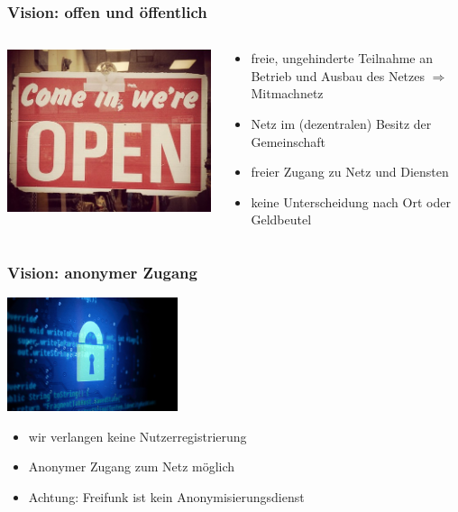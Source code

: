 \documentclass[10pt]{beamer}
\begin{document}
\begin{frame}
	\frametitle{Vision: offen und öffentlich}
	\begin{columns}[c]
		\begin{column}{5cm}
			\includegraphics[width=\textwidth]{images/open}
		\end{column}
		\begin{column}{7cm}
			\begin{itemize}[<+->]
				\item freie, ungehinderte Teilnahme an Betrieb und Ausbau des Netzes $\Rightarrow$ Mitmachnetz
				\item Netz im (dezentralen) Besitz der Gemeinschaft
				\item freier Zugang zu Netz und Diensten
				\item keine Unterscheidung nach Ort oder Geldbeutel
			\end{itemize}
		\end{column}
	\end{columns}	
\end{frame}

\begin{frame}
	\frametitle{Vision: anonymer Zugang}
	\begin{center}
		\includegraphics[width=5cm]{images/lock}
	\end{center}
	\begin{itemize}[<+->]
		\item wir verlangen keine Nutzerregistrierung
		\item Anonymer Zugang zum Netz möglich
		\item Achtung: Freifunk ist kein Anonymisierungsdienst
	\end{itemize}

\end{frame}
\end{document}
